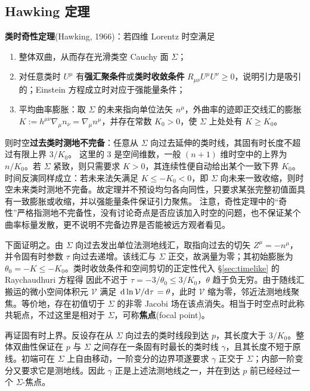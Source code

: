 
\subsection{Hawking 定理}\label{sec:Hawking}

\noindent \textbf{类时奇性定理}(Hawking, 1966)：若四维 Lorentz 时空满足
\begin{enumerate}
    \item 整体双曲，从而存在光滑类空 Cauchy 面 $\Sigma$；
    \item 对任意类时 $U^\mu$ 有\textbf{强汇聚条件}或\textbf{类时收敛条件} $R_{\mu\nu}U^\mu U^\nu \geqslant 0$，说明引力是吸引的；Einstein 方程成立时对应于强能量条件；
    \item 平均曲率膨胀：取 $\Sigma$ 的未来指向单位法矢 $n^\mu$，外曲率的迹即正交线汇的膨胀 $K:=h^{\mu\nu}\nabla_\mu n_\nu=\nabla_\mu n^\mu$，并存在常数 $K_0>0$，使 $\Sigma$ 上处处有 $K\geqslant K_0$。
\end{enumerate}
则时空\textbf{过去类时测地不完备}：任意从 $\Sigma$ 向过去延伸的类时线，其固有时长度不超过有限上界 $3/K_0$。
这里的 $3$ 是空间维数，一般 $(n+1)$ 维时空中的上界为 $n/K_0$。若 $\Sigma$ 紧致，则只需要求 $K>0$，其连续性便自动给出某个一致下界 $K_0$。
时间反演同样成立：若未来法矢满足 $K\leqslant-K_0<0$，即 $\Sigma$ 向未来一致收缩，则时空未来类时测地不完备。故定理并不预设均匀各向同性，只要求某张完整初值面具有一致膨胀或收缩，并以强能量条件保证引力聚焦。
注意，奇性定理中的“奇性”严格指测地不完备性，没有讨论奇点是否应该加入时空的问题，也不保证某个曲率标量发散，更不说明不完备边界是否能被远方观者看见。

下面证明之。由 $\Sigma$ 向过去发出单位法测地线汇，取指向过去的切矢 $Z^\mu=-n^\mu$，并令固有时参数 $\tau$ 向过去递增。该线汇与 $\Sigma$ 正交，故涡量为零；其初始膨胀为 $\theta_0=-K\leqslant-K_0$。类时收敛条件和空间剪切的正定性代入 \S\ref{sec:timelike} 的 Raychaudhuri 方程得
因此不迟于 $\tau=-3/\theta_0\leqslant3/K_0$，$\theta$ 趋于负无穷。由于随线汇搬运的微小空间体积元 $\mathcal V$ 满足 $\dv*{\ln\mathcal V}{\tau}=\theta$，此时 $\mathcal V$ 缩为零，邻近法测地线聚焦。等价地，存在初值切于 $\Sigma$ 的非零 Jacobi 场在该点消失。相当于时空点时此称共轭点，不过这里是相对于 $\Sigma$，可称\textbf{焦点}(focal point)。

再证固有时上界。反设存在从 $\Sigma$ 向过去的类时线段到达 $p$，其长度大于 $3/K_0$。整体双曲性保证在 $p$ 与 $\Sigma$ 之间存在一条固有时最长的类时线 $\gamma$，且其长度不短于原线。初端可在 $\Sigma$ 上自由移动，一阶变分的边界项遂要求 $\gamma$ 正交于 $\Sigma$；内部一阶变分又要求它是测地线。因此 $\gamma$ 正是上述法测地线之一，并在到达 $p$ 前已经经过一个 $\Sigma$-焦点。

